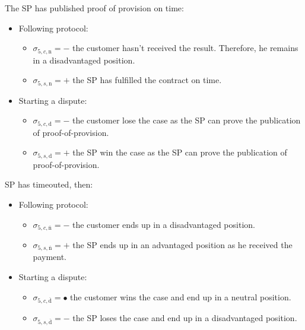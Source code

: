 \documentclass{ieeeaccess}
\begin{document}
The SP has published proof of provision on time:

\begin{itemize}
\item
  Following protocol:

  \begin{itemize}
  
  \item
    \(\sigma_{5, c, \mathrm{n}} = -\) the customer hasn't received the
    result. Therefore, he remains in a disadvantaged position.
  \item
    \(\sigma_{5, s, \mathrm{n}} = +\) the SP has fulfilled the contract
    on time.
  \end{itemize}
\item
  Starting a dispute:

  \begin{itemize}
  
  \item
    \(\sigma_{5, c, \mathrm{d}} = -\) the customer lose the case as the
    SP can prove the publication of proof-of-provision.
  \item
    \(\sigma_{5, s, \mathrm{d}} = +\) the SP win the case as the SP can
    prove the publication of proof-of-provision.
  \end{itemize}
\end{itemize}

SP has timeouted, then:

\begin{itemize}
\item
  Following protocol:

  \begin{itemize}
  
  \item
    \(\sigma_{5, c, \overline{\mathrm{n}}} = -\) the customer ends up in a disadvantaged position.
  \item
    \(\sigma_{5, s, \overline{\mathrm{n}}} = +\) the SP ends up in
    an advantaged position as he received the payment.
  \end{itemize}
\item
  Starting a dispute:

  \begin{itemize}
  
  \item
    \(\sigma_{5, c, \overline{\mathrm{d}}} = •\) the customer wins the
    case and end up in a neutral position.
  \item
    \(\sigma_{5, s, \overline{\mathrm{d}}} = -\) the SP loses the case
    and end up in a disadvantaged position.
  \end{itemize}
\end{itemize}
\end{document}
